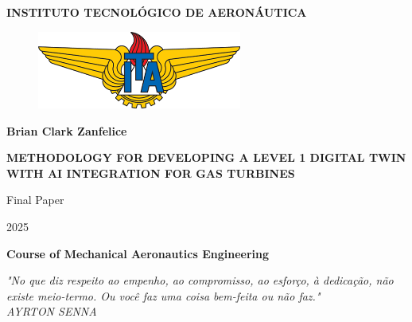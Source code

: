 \documentclass[
  12pt,
  oneside,
  a4paper,
  english,
  brazil]{abntex2}
\author{}
\date{}
\begin{document}
\setlength{\parindent}{0mm}
\ABNTEXchapterfont\normalsize

\ABNTEXchapterfont\normalsize

\begin{center}
\Large{\textbf{\uppercase{ Instituto Tecnológico de Aeronáutica }}}

\vspace{1cm}

\begin{figure}[H]
\centering

\includegraphics[width=0.6\textwidth]{figuras/ITA_logo.png}

\end{figure}

\vspace{2cm}

\large{\textbf{ Brian Clark Zanfelice }}

\vspace{1cm}

\Large{\textbf{\uppercase{ Methodology for Developing a Level 1 Digital Twin with AI Integration for Gas Turbines }}}

\vspace{3cm}

Final Paper

2025

\vfill

\huge{\textbf{ Course of Mechanical Aeronautics Engineering }}


\end{center}

\newpage{}

\vspace*{\fill}

\hfill
\begin{minipage}{0.90\textwidth}
    \begin{flushright}
        \textit{ "No que diz respeito ao empenho, ao compromisso, ao esforço, à dedicação, não existe meio-termo. Ou você faz uma coisa bem-feita ou não faz." } \\
        \textit{ AYRTON SENNA }
    \end{flushright}
\end{minipage}
\end{document}
